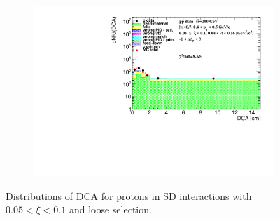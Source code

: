 \begin{figure}[h!]
\begin{subfigure}{.45\textwidth}
		\includegraphics[width=\linewidth, page=14]{chapters/chrgSTAR/img/DCAproton/background_p_1.pdf}
	\end{subfigure}
	\caption{Distributions of DCA for protons in SD interactions with $0.05 < \xi<0.1$ and loose selection.}
	\label{fig:dca_proton_1}
\end{figure}
